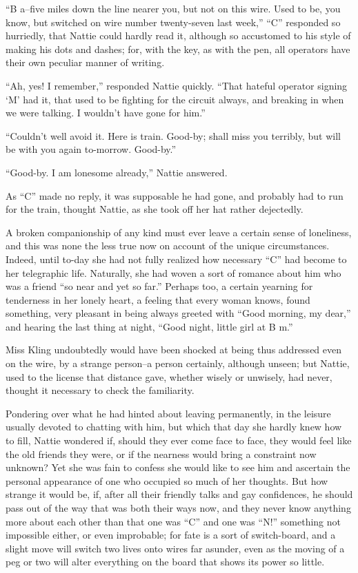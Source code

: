 ``B a--five miles down the line nearer you, but not on this wire. Used to
be, you know, but switched on wire number twenty-seven last week,'' ``C''
responded so hurriedly, that Nattie could hardly read it, although so
accustomed to his style of making his dots and dashes; for, with the
key, as with the pen, all operators have their own peculiar manner of
writing.

``Ah, yes! I remember,'' responded Nattie quickly. ``That hateful operator
signing `M' had it, that used to be fighting for the circuit always, and
breaking in when we were talking. I wouldn't have gone for him.''

``Couldn't well avoid it. Here is train. Good-by; shall miss you
terribly, but will be with you again to-morrow. Good-by.''

``Good-by. I am lonesome already,'' Nattie answered.

As ``C'' made no reply, it was supposable he had gone, and probably had to
run for the train, thought Nattie, as she took off her hat rather
dejectedly.

A broken companionship of any kind must ever leave a certain sense of
loneliness, and this was none the less true now on account of the unique
circumstances. Indeed, until to-day she had not fully realized how
necessary ``C'' had become to her telegraphic life. Naturally, she had
woven a sort of romance about him who was a friend ``so near and yet so
far.'' Perhaps too, a certain yearning for tenderness in her lonely
heart, a feeling that every woman knows, found something, very pleasant
in being always greeted with ``Good morning, my dear,'' and hearing the
last thing at night, ``Good night, little girl at B m.''

Miss Kling undoubtedly would have been shocked at being thus addressed
even on the wire, by a strange person--a person certainly, although
unseen; but Nattie, used to the license that distance gave, whether
wisely or unwisely, had never, thought it necessary to check the
familiarity.

Pondering over what he had hinted about leaving permanently, in the
leisure usually devoted to chatting with him, but which that day she
hardly knew how to fill, Nattie wondered if, should they ever come face
to face, they would feel like the old friends they were, or if the
nearness would bring a constraint now unknown? Yet she was fain to
confess she would like to see him and ascertain the personal appearance
of one who occupied so much of her thoughts. But how strange it would
be, if, after all their friendly talks and gay confidences, he should
pass out of the way that was both their ways now, and they never know
anything more about each other than that one was ``C'' and one was ``N!''
something not impossible either, or even improbable; for fate is a sort
of switch-board, and a slight move will switch two lives onto wires far
asunder, even as the moving of a peg or two will alter everything on the
board that shows its power so little.

